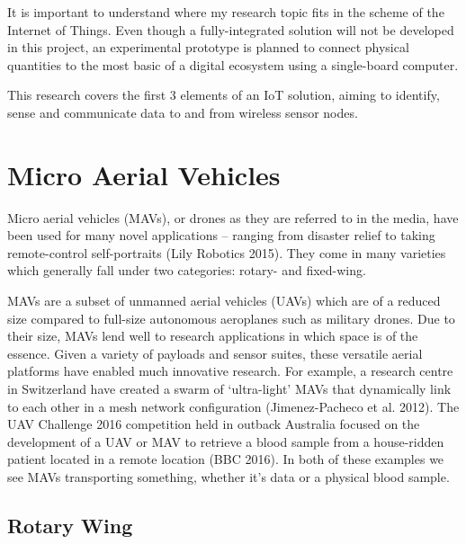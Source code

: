 It is important to understand where my research topic fits in the scheme of the Internet of Things. Even though a fully-integrated solution will not be developed in this project, an experimental prototype is planned to connect physical quantities to the most basic of a digital ecosystem using a single-board computer.

This research covers the first 3 elements of an IoT solution, aiming to identify, sense and communicate data to and from wireless sensor nodes.


\section{Micro Aerial Vehicles}

Micro aerial vehicles (MAVs), or drones as they are referred to in the media, have been used for many novel applications – ranging from disaster relief to taking remote-control self-portraits (Lily Robotics 2015). They come in many varieties which generally fall under two categories: rotary- and fixed-wing.

MAVs are a subset of unmanned aerial vehicles (UAVs) which are of a reduced size compared to full-size autonomous aeroplanes such as military drones. Due to their size, MAVs lend well to research applications in which space is of the essence. Given a variety of payloads and sensor suites, these versatile aerial platforms have enabled much innovative research.
For example, a research centre in Switzerland have created a swarm of ‘ultra-light’ MAVs that dynamically link to each other in a mesh network configuration (Jimenez-Pacheco et al. 2012).
The UAV Challenge 2016 competition held in outback Australia focused on the development of a UAV or MAV to retrieve a blood sample from a house-ridden patient located in a remote location (BBC 2016). In both of these examples we see MAVs transporting something, whether it’s data or a physical blood sample.


\subsection{Rotary Wing}

